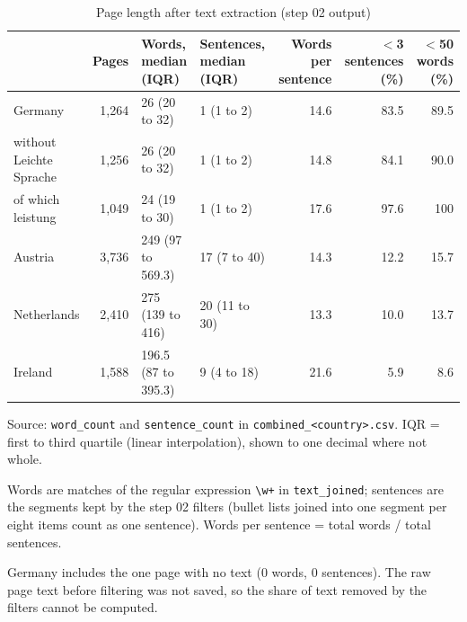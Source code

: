 \begin{table}[htbp]
\centering
\small
\begin{threeparttable}
\caption{Page length after text extraction (step 02 output)}
\label{tab:dc_page_length}
\begin{tabular}{lrllrrr}
\hline
 & Pages & Words, median (IQR) & Sentences, median (IQR) & Words per sentence & $<$3 sentences (\%) & $<$50 words (\%) \\
\hline
Germany & 1,264 & 26 (20 to 32) & 1 (1 to 2) & 14.6 & 83.5 & 89.5 \\
\quad without Leichte Sprache & 1,256 & 26 (20 to 32) & 1 (1 to 2) & 14.8 & 84.1 & 90.0 \\
\quad of which leistung & 1,049 & 24 (19 to 30) & 1 (1 to 2) & 17.6 & 97.6 & 100 \\
\hline
Austria & 3,736 & 249 (97 to 569.3) & 17 (7 to 40) & 14.3 & 12.2 & 15.7 \\
Netherlands & 2,410 & 275 (139 to 416) & 20 (11 to 30) & 13.3 & 10.0 & 13.7 \\
Ireland & 1,588 & 196.5 (87 to 395.3) & 9 (4 to 18) & 21.6 & 5.9 & 8.6 \\
\hline
\end{tabular}
\begin{tablenotes}
\footnotesize
\item Source: \texttt{word\_count} and \texttt{sentence\_count} in \texttt{combined\_<country>.csv}. IQR = first to third quartile (linear interpolation), shown to one decimal where not whole.
\item Words are matches of the regular expression \texttt{\textbackslash w+} in \texttt{text\_joined}; sentences are the segments kept by the step 02 filters (bullet lists joined into one segment per eight items count as one sentence). Words per sentence = total words / total sentences.
\item Germany includes the one page with no text (0 words, 0 sentences). The raw page text before filtering was not saved, so the share of text removed by the filters cannot be computed.
\end{tablenotes}
\end{threeparttable}
\end{table}
